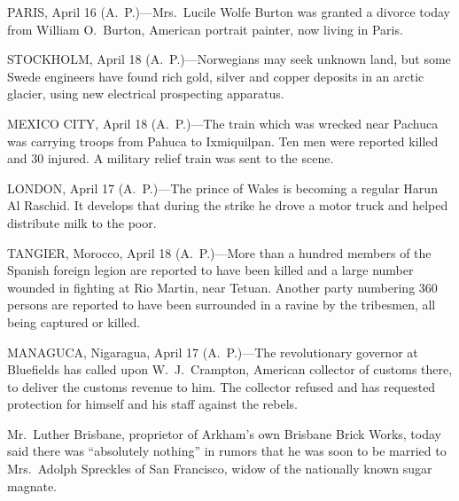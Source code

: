 \documentclass{newspaper1920}
\begin{document}
\begin{multicols}{3}


PARIS, April 16 (A.~P.)---Mrs.~Lucile Wolfe Burton was granted a
divorce today from William O.\ Burton, American portrait painter, now
living in Paris.

\halfrule


STOCKHOLM, April 18 (A.~P.)---Norwegians may seek unknown land, but
some Swede engineers have found rich gold, silver and copper deposits
in an arctic glacier, using new electrical prospecting apparatus.

\halfrule


MEXICO CITY, April 18 (A.~P.)---The train which was wrecked near
Pachuca was carrying troops from Pahuca to Ixmiquilpan.  Ten men were
reported killed and 30 injured.  A military relief train was sent to
the scene.

\halfrule


LONDON, April 17 (A.~P.)---The prince of Wales is becoming a regular
Harun Al Raschid.  It develops that during the strike he drove a motor
truck and helped distribute milk to the poor.

\halfrule


TANGIER, Morocco, April 18 (A.~P.)---More than a hundred members of
the Spanish foreign legion are reported to have been killed and a
large number wounded in fighting at Rio Martin, near Tetuan.  Another
party numbering 360 persons are reported to have been surrounded in a
ravine by the tribesmen, all being captured or killed.

\halfrule


MANAGUCA, Nigaragua, April 17 (A.~P.)---The revolutionary governor at
Bluefields has called upon W.~J.~Crampton, American collector of
customs there, to deliver the customs revenue to him.  The collector
refused and has requested protection for himself and his staff against
the rebels.

\columnbreak


Mr.~Luther Brisbane, proprietor of Arkham's own Brisbane Brick Works,
today said there was ``absolutely nothing'' in rumors that he was soon
to be married to Mrs.~Adolph Spreckles of San Francisco, widow of the
nationally known sugar magnate.


\end{multicols}
\end{document}
